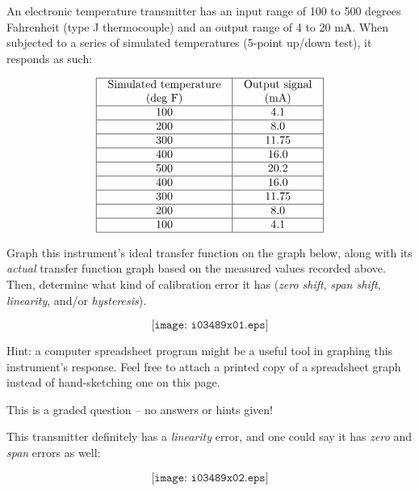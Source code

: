 

An electronic temperature transmitter has an input range of 100 to 500 degrees Fahrenheit (type J thermocouple) and an output range of 4 to 20 mA.  When subjected to a series of simulated temperatures (5-point up/down test), it responds as such:


$$\vbox{\offinterlineskip
\halign{\strut
\vrule \quad\hfil # \ \hfil & 
\vrule \quad\hfil # \ \hfil \vrule \cr
\noalign{\hrule}
%
Simulated temperature & Output signal \cr
%
(deg F) & (mA) \cr
%
\noalign{\hrule}
%
100 & 4.1 \cr
%
\noalign{\hrule}
%
200 & 8.0 \cr
%
\noalign{\hrule}
%
300 & 11.75 \cr
%
\noalign{\hrule}
%
400 & 16.0 \cr
%
\noalign{\hrule}
%
500 & 20.2 \cr
%
\noalign{\hrule}
%
400 & 16.0 \cr
%
\noalign{\hrule}
%
300 & 11.75 \cr
%
\noalign{\hrule}
%
200 & 8.0 \cr
%
\noalign{\hrule}
%
100 & 4.1 \cr
%
\noalign{\hrule}
} %
}$$ %

Graph this instrument's ideal transfer function on the graph below, along with its {\it actual} transfer function graph based on the measured values recorded above.  Then, determine what kind of calibration error it has ({\it zero shift}, {\it span shift}, {\it linearity}, and/or {\it hysteresis}).

$$\texttt{[image: i03489x01.eps]}$$

\vfil 

Hint: a computer spreadsheet program might be a useful tool in graphing this instrument's response.  Feel free to attach a printed copy of a spreadsheet graph instead of hand-sketching one on this page.

\eject






This is a graded question -- no answers or hints given!







This transmitter definitely has a {\it linearity} error, and one could say it has {\it zero} and {\it span} errors as well:

$$\texttt{[image: i03489x02.eps]}$$



